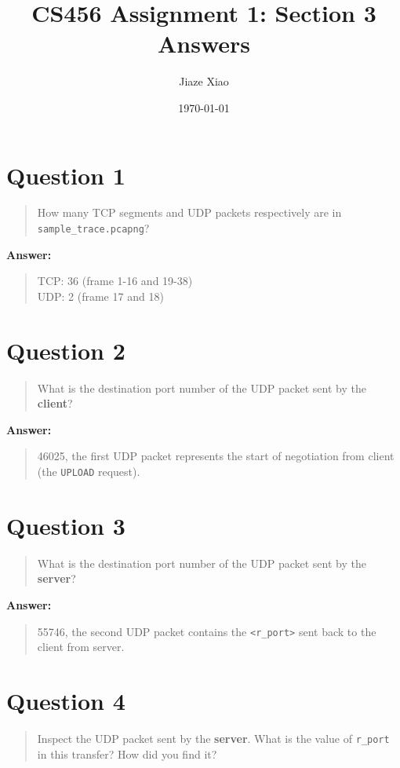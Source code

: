 \documentclass{article}
\title{CS456 Assignment 1: Section 3 Answers}
\author{Jiaze Xiao}
\date{\today}
\begin{document}
\maketitle

\section*{Question 1}
\begin{quote}
    How many TCP segments and UDP packets respectively are in \texttt{sample\_trace.pcapng}?
\end{quote}

\textbf{Answer:}
\begin{quote}
    TCP: 36 (frame 1-16 and 19-38)\\
    UDP: 2 (frame 17 and 18)
\end{quote}

\section*{Question 2}
\begin{quote}
    What is the destination port number of the UDP packet sent by the \textbf{client}?
\end{quote}

\textbf{Answer:}
\begin{quote}
    46025, the first UDP packet represents the start of negotiation from client (the \texttt{UPLOAD} request).
\end{quote}

\section*{Question 3}
\begin{quote}
    What is the destination port number of the UDP packet sent by the \textbf{server}?
\end{quote}

\textbf{Answer:}
\begin{quote}
    55746, the second UDP packet contains the \texttt{<r\_port>} sent back to the client from server.
\end{quote}

\section*{Question 4}
\begin{quote}
    Inspect the UDP packet sent by the \textbf{server}. What is the value of \texttt{r\_port} in this transfer? How did you find it?
\end{quote}
\end{document}
